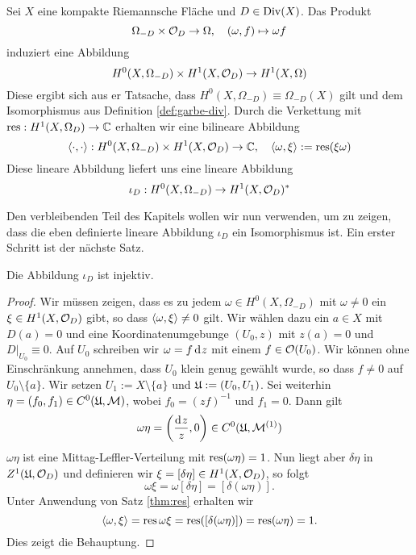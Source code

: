 \begin{defin}
  Sei $X$ eine kompakte Riemannsche Fläche und $D \in \operatorname{Div}(X)$. Das
  Produkt
  \[
  \Omega_{-D} \times \mathcal{O}_D \rightarrow \Omega, \quad (\omega, f) \mapsto
  \omega f
  \]
  induziert eine Abbildung
  \[
  H^0(X, \Omega_{-D}) \times H^1(X, \mathcal{O}_D) \rightarrow H^1(X, \Omega)
  \]
  Diese ergibt sich aus er Tatsache, dass $H^0(X, \Omega_{-D}) \equiv
  \Omega_{-D}(X)$ gilt und dem Isomorphismus aus Definition
  \ref{def:garbe-div}. Durch die Verkettung mit $\operatorname{res}: H^1(X,
  \Omega_D) \rightarrow \mathbb{C}$ erhalten wir eine bilineare Abbildung
  \[
  \langle \cdot, \cdot \rangle: H^0(X, \Omega_{-D}) \times H^1(X, \mathcal{O}_D) \rightarrow \mathbb{C},
  \quad \langle \omega, \xi \rangle := \operatorname{res}(\xi \omega)
  \]
  Diese lineare Abbildung liefert uns eine lineare Abbildung
  \[
  \iota_D : H^0(X, \Omega_{-D}) \rightarrow H^1(X, \mathcal{O}_D)^\ast
  \]
\end{defin}

Den verbleibenden Teil des Kapitels wollen wir nun verwenden, um zu zeigen, dass die
eben definierte lineare Abbildung $\iota_D$ ein Isomorphismus ist. Ein
erster Schritt ist der nächste Satz.

\begin{thm}
  \label{thm:iota-inj}
  Die Abbildung $\iota_D$ ist injektiv.
\end{thm}

\begin{proof}
  Wir müssen zeigen, dass es zu jedem $\omega \in H^0(X, \Omega_{-D})$
  mit $\omega \neq 0$ ein $\xi \in H^1(X, \mathcal{O}_D)$ gibt, so dass
  $\langle \omega, \xi \rangle \neq 0$ gilt. Wir wählen dazu ein $a \in X$ mit
  $D(a) = 0$ und eine Koordinatenumgebunge $(U_0, z)$ mit $z(a) = 0$
  und $D|_{U_0} \equiv 0$. Auf $U_0$ schreiben wir $\omega = f \d[z]$
  mit einem $f \in \mathcal{O}(U_0)$. Wir können ohne Einschränkung annehmen,
  dass $U_0$ klein genug gewählt wurde, so dass $f \neq 0$ auf $U_0
  \setminus \{a\}$. Wir setzen $U_1 := X \setminus \{a\}$ und $\mathfrak{U} :=
  (U_0, U_1)$. Sei weiterhin $\eta = (f_0, f_1) \in C^0(\mathfrak{U}, \mathcal{M})$,
  wobei $f_0 = (z f)^{-1}$ und $f_1 = 0$. Dann gilt
  \[
  \omega \eta = \left ( \frac{\d[z]}{z}, 0 \right ) \in C^0(\fu,
  \mer^{(1)})
  \]
  $\omega \eta$ ist eine Mittag-Leffler-Verteilung mit
  $\operatorname{res}(\omega\eta) = 1$. Nun liegt aber $\delta \eta$ in $Z^1(\mathfrak{U},
  \mathcal{O}_D)$ und definieren wir $\xi = [\delta \eta] \in H^1(X,
  \mathcal{O}_D)$, so folgt
  \[
  \omega \xi = \omega [\delta \eta] = [ \delta( \omega \eta)].
  \]
  Unter Anwendung von Satz \ref{thm:res} erhalten wir
  \[
  \langle \omega, \xi \rangle = \operatorname{res}{\omega \xi} = \operatorname{res}([\delta(\omega \eta)]) =
  \operatorname{res}(\omega \eta) = 1.
  \]
  Dies zeigt die Behauptung.
\end{proof}

